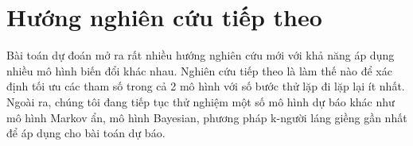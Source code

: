 \section{Hướng nghiên cứu tiếp theo}
Bài toán dự đoán mở ra rất nhiều hướng nghiên cứu mới với khả năng áp dụng nhiều mô hình biến đổi khác nhau. Nghiên cứu tiếp theo là làm thế nào để xác định tối ưu các tham số trong cả 2 mô hình với số bước thử lặp đi lặp lại ít nhất. Ngoài ra, chúng tôi đang tiếp tục thử nghiệm một số mô hình dự báo khác như mô hình Markov ẩn, mô hình Bayesian, phương pháp k-người láng giềng gần nhất để áp dụng cho bài toán dự báo. 